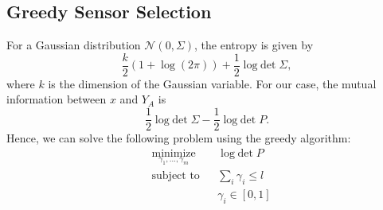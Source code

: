 \documentclass{article}
\DeclareMathOperator{\logdet}{log\;det}
\begin{document}
\subsection{Greedy Sensor Selection}
For a Gaussian distribution $\mathcal N(0,\Sigma)$, the entropy is given by
\begin{displaymath}
  \frac{k}{2}(1+\log(2\pi))+\frac{1}{2}\logdet \Sigma ,
\end{displaymath}
where $k$ is the dimension of the Gaussian variable. For our case, the mutual information between $x$ and $Y_A$ is
\begin{displaymath}
  \frac{1}{2}\logdet \Sigma - \frac{1}{2}\logdet P. 
\end{displaymath}
Hence, we can solve the following problem using the greedy algorithm:
    \begin{align*}
      &\mathop{\textrm{minimize}}\limits_{\gamma_1,\dots,\gamma_m}&
      & \logdet P\nonumber\\
      &\textrm{subject to}&
      & \sum_i \gamma_i\leq l\\
      &&& \gamma_i \in[0, 1]
    \end{align*}
\end{document}
